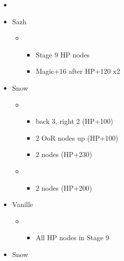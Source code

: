 \begin{menu}
	\begin{itemize}
	\paradigm
		\begin{itemize}
			\item {}%
				{\paradigmline{(\rav)}{\sen}{(\rav)}}%
				{\paradigmline[4]{\sab}{\sen}{\sab}}%
				{\paradigmline{\syn}{\sen}{(\med)}}%
				{\paradigmline{\com}{\com}{\sab}}%
				{\paradigmline{\rav}{\sen}{\rav}}%
				{\paradigmline{\rav}{(\sen)}{(\med)}}%
		\end{itemize}
	\crystarium
		\begin{itemize}
			\item Sazh
				\begin{itemize}
					\item \rav
						\begin{itemize}
							\item Stage 9 HP nodes
							\item Magic+16 after HP+120 x2
						\end{itemize}
				\end{itemize}
			\item Snow
				\begin{itemize}
					\item \com
						\begin{itemize}
							\item back 3, right 2 (HP+100)
							\item 2 OoR nodes up (HP+100)
							\item 2 nodes (HP+230)
						\end{itemize}
					\item \sen
						\begin{itemize}
							\item 2 nodes (HP+200)
						\end{itemize}
				\end{itemize}
			\item Vanille
				\begin{itemize}
					\item \med
						\begin{itemize}
							\item All HP nodes in Stage 9
						\end{itemize}
				\end{itemize}								
		\end{itemize}
	\equip
		\begin{itemize}
			\item Snow
				\begin{itemize}

\end{itemize}
\end{itemize}
\end{itemize}
\end{menu}
